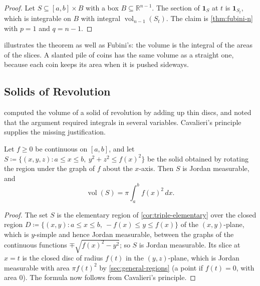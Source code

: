 \begin{proof}
Let $S\subseteq[a,b]\times B$ with a box $B\subseteq\mathbb R^{n-1}$. The section of $\mathbf 1_S$ at $t$ is $\mathbf 1_{S_t}$, which is integrable on $B$ with integral $\operatorname{vol}_{n-1}(S_t)$. The claim is \cref{thm:fubini-n} with $p=1$ and $q=n-1$.
\end{proof}

 illustrates the theorem as well as Fubini's: the volume is the integral of the areas of the slices. A slanted pile of coins has the same volume as a straight one, because each coin keeps its area when it is pushed sideways.

\subsection{Solids of Revolution}

 computed the volume of a solid of revolution by adding up thin discs, and noted that the argument required integrals in several variables. Cavalieri's principle supplies the missing justification.

\begin{proposition}
\label{prop:revolution}
Let $f\ge0$ be continuous on $[a,b]$, and let $S\coloneqq\{(x,y,z): a\le x\le b,\ y^2+z^2\le f(x)^2\}$ be the solid obtained by rotating the region under the graph of $f$ about the $x$-axis. Then $S$ is Jordan measurable, and
\[
\operatorname{vol}(S)=\pi\int_a^bf(x)^2\,dx .
\]
\end{proposition}

\begin{proof}
The set $S$ is the elementary region of \cref{cor:triple-elementary} over the closed region $D\coloneqq\{(x,y): a\le x\le b,\ -f(x)\le y\le f(x)\}$ of the $(x,y)$-plane, which is $y$-simple and hence Jordan measurable, between the graphs of the continuous functions $\mp\sqrt{f(x)^2-y^2}$; so $S$ is Jordan measurable. Its slice at $x=t$ is the closed disc of radius $f(t)$ in the $(y,z)$-plane, which is Jordan measurable with area $\pi f(t)^2$ by \cref{sec:general-regions} (a point if $f(t)=0$, with area $0$). The formula now follows from Cavalieri's principle.
\end{proof}

